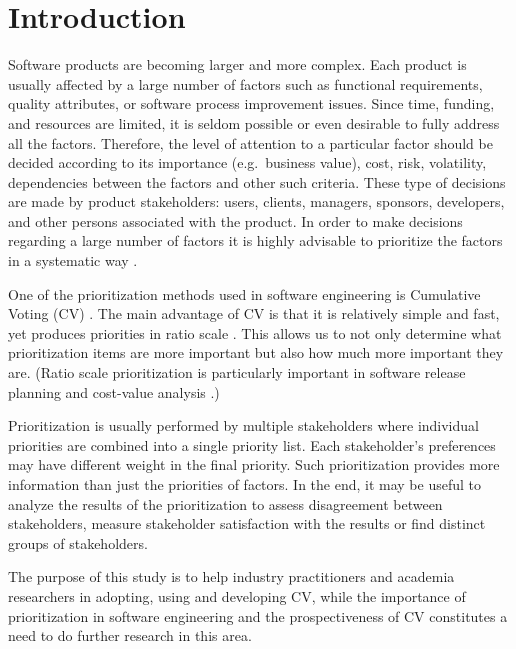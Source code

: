 \section{\label{intro}Introduction}

Software products are becoming larger and more complex. Each product
is usually affected by a large number of factors such as functional
requirements, quality attributes, or software process improvement
issues. Since time, funding, and resources are limited, it is seldom
possible or even desirable to fully address all the factors. Therefore,
the level of attention to a particular factor should be decided according
to its importance (e.g.\ business value), cost, risk, volatility, 
dependencies between the factors and other such criteria. 
These type of decisions are made by product stakeholders:
users, clients, managers, sponsors, developers, and other persons
associated with the product. In order to make decisions regarding a
large number of factors it is highly advisable to prioritize the factors
in a systematic way \cite{Berander2005}.

One of the prioritization methods used in software engineering is Cumulative Voting (CV) \cite{Leffingwell1999}.
The main advantage of CV is that it is relatively simple and fast, yet produces priorities in ratio scale \cite{Berander2005,Ahl2005}.
This allows us to not only determine what prioritization items are more important but also how much more important they are.
(Ratio scale prioritization is particularly important in software release planning and cost-value analysis \cite{Berander2006a, Karlsson1997}.)

Prioritization is usually performed by multiple stakeholders where individual priorities are combined into a single priority list.
Each stakeholder's preferences may have different weight in the final priority.
Such prioritization provides more information than just the priorities of factors.
In the end, it may be useful to analyze the results of the prioritization to assess disagreement between stakeholders, measure stakeholder satisfaction with the results or find distinct groups of stakeholders.

The purpose of this study is to help industry practitioners and academia researchers in adopting, using and developing CV, while the importance of prioritization in software engineering and the prospectiveness of CV constitutes a need to do further research in this area.

